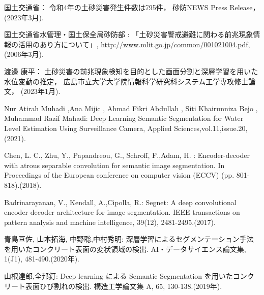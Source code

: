   国土交通省：
  令和4年の土砂災害発生件数は795件，
  砂防NEWS Press Release，(2023年3月).

  国土交通省水管理・国土保全局砂防部 : 
  「土砂災害警戒避難に関わる前兆現象情報の活用のあり方について」, 
  \url{http://www.mlit.go.jp/common/001021004.pdf}, (2006年3月). 



  渡邊 康平：
  土砂災害の前兆現象検知を目的とした画面分割と深層学習を用いた水位変動の推定，
  広島市立大学大学院情報科学研究科システム工学専攻修士論文，
  (2023年1月). 

  Nur Atirah Muhadi ,Ana Mijic , Ahmad Fikri Abdullah ,
  Siti Khairunniza Bejo , Muhammad Razif Mahadi: 
  Deep Learning Semantic Segmentation for Water Level Estimation Using Surveillance Camera,
  Applied Sciences,vol.11,issue.20,(2021).

  Chen, L. C., Zhu, Y., Papandreou, G., Schroff, F.,Adam, H. :
  Encoder-decoder with atrous separable convolution for semantic image segmentation. 
  In Proceedings of the European conference on computer vision (ECCV) (pp. 801-818).(2018).

  Badrinarayanan, V., Kendall, A.,Cipolla, R.:
  Segnet: A deep convolutional encoder-decoder architecture for image segmentation. 
  IEEE transactions on pattern analysis and machine intelligence, 39(12), 2481-2495.(2017).

  青島亘佐, 山本拓海, 中野聡,中村秀明:
  深層学習によるセグメンテーション手法を用いたコンクリート表面の変状領域の検出.
  AI・データサイエンス論文集, 1(J1), 481-490.(2020年).
  
  山根達郎,全邦釘: 
  Deep learning による Semantic Segmentation を用いたコンクリート表面ひび割れの検出. 
  構造工学論文集 A, 65, 130-138.(2019年).
